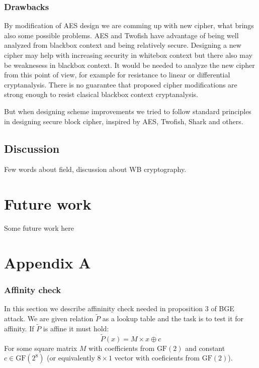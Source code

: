 \documentclass[11pt,oneside,final]{fithesis2}
\begin{document}
    \subsection*{Drawbacks}
    By modification of AES design we are comming up with new cipher, what brings also some possible problems. AES and Twofish have advantage of being well analyzed from blackbox 
    context and being relatively secure. Designing a new cipher may help with increasing security in whitebox context but there also may be weaknesess in blackbox context. 
    It would be needed to analyze the new cipher from this point of view, for example for resistance to linear or differential cryptanalysis. There is no guarantee that 
    proposed cipher modifications are strong enough to resist clasical blackbox context cryptanalysis.
    
    But when designing scheme improvements we tried to follow standard principles in designing secure block cipher, inspired by AES, Twofish, Shark and others.
    
    \section{Discussion}
    Few words about field, discussion about WB cryptography.
    
\chapter{Future work}\label{sec:futurework}
    Some future work here

\appendix

\chapter{Appendix A}
    \subsection{Affinity check}\label{appendix:affcheck}
    In this section we describe affininity check needed in proposition 3 of BGE attack. We are given relation $\widetilde{P}$ as a lookup table
    and the task is to test it for affinity. If $\widetilde{P}$ is affine it must hold:
    \begin{equation}
	\widetilde{P}\left(x\right) = M \times x \oplus c
    \end{equation}
    For some square matrix $M$ with coefficients from $\text{GF}(2)$ and constant $c \in \text{GF}(2^8)$ (or equivalently $8\times1$ vector with coeficients from $\text{GF}(2)$).\\
    
\end{document}

